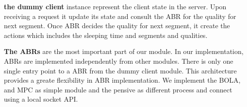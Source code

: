 {\bf the dummy client} instance represent the client state in the server. Upon receiving a request it update its state and consult the ABR for the quality for next segment. Once ABR decides the quality for next segment, it create the actions which includes the sleeping time and segments and qualities.

{\bf The ABRs} are the most important part of our module. In our implementation, ABRs are implemented independently from other modules. There is only one single entry point to a ABR from the dummy client module. This architecture provides a greate flexibility in ABR implementation. We implement the BOLA, and MPC as simple \python module and the pensive as different process and connect using a local socket API.


